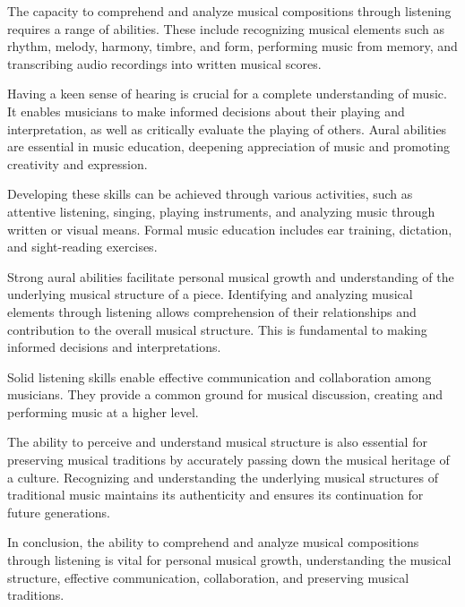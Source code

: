 The capacity to comprehend and analyze musical compositions through listening requires a range of abilities. These include recognizing musical elements such as rhythm, melody, harmony, timbre, and form, performing music from memory, and transcribing audio recordings into written musical scores.

Having a keen sense of hearing is crucial for a complete understanding of music. It enables musicians to make informed decisions about their playing and interpretation, as well as critically evaluate the playing of others. Aural abilities are essential in music education, deepening appreciation of music and promoting creativity and expression.

Developing these skills can be achieved through various activities, such as attentive listening, singing, playing instruments, and analyzing music through written or visual means. Formal music education includes ear training, dictation, and sight-reading exercises.

Strong aural abilities facilitate personal musical growth and understanding of the underlying musical structure of a piece. Identifying and analyzing musical elements through listening allows comprehension of their relationships and contribution to the overall musical structure. This is fundamental to making informed decisions and interpretations.

Solid listening skills enable effective communication and collaboration among musicians. They provide a common ground for musical discussion, creating and performing music at a higher level.

The ability to perceive and understand musical structure is also essential for preserving musical traditions by accurately passing down the musical heritage of a culture. Recognizing and understanding the underlying musical structures of traditional music maintains its authenticity and ensures its continuation for future generations.

In conclusion, the ability to comprehend and analyze musical compositions through listening is vital for personal musical growth, understanding the musical structure, effective communication, collaboration, and preserving musical traditions.